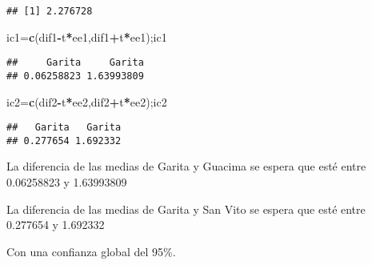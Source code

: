 \documentclass[
]{article}
\newenvironment{Shaded}{\begin{snugshade}}{\end{snugshade}}
\newcommand{\FunctionTok}[1]{\textcolor[rgb]{0.13,0.29,0.53}{\textbf{#1}}}
\newcommand{\NormalTok}[1]{#1}
\newcommand{\OtherTok}[1]{\textcolor[rgb]{0.56,0.35,0.01}{#1}}
\newcommand{\SpecialCharTok}[1]{\textcolor[rgb]{0.81,0.36,0.00}{\textbf{#1}}}
\begin{document}
\begin{verbatim}
## [1] 2.276728
\end{verbatim}

\begin{Shaded}
\begin{Highlighting}[]
\NormalTok{ic1}\OtherTok{=}\FunctionTok{c}\NormalTok{(dif1}\SpecialCharTok{{-}}\NormalTok{t}\SpecialCharTok{*}\NormalTok{ee1,dif1}\SpecialCharTok{+}\NormalTok{t}\SpecialCharTok{*}\NormalTok{ee1);ic1}
\end{Highlighting}
\end{Shaded}

\begin{verbatim}
##     Garita     Garita 
## 0.06258823 1.63993809
\end{verbatim}

\begin{Shaded}
\begin{Highlighting}[]
\NormalTok{ic2}\OtherTok{=}\FunctionTok{c}\NormalTok{(dif2}\SpecialCharTok{{-}}\NormalTok{t}\SpecialCharTok{*}\NormalTok{ee2,dif2}\SpecialCharTok{+}\NormalTok{t}\SpecialCharTok{*}\NormalTok{ee2);ic2}
\end{Highlighting}
\end{Shaded}

\begin{verbatim}
##   Garita   Garita 
## 0.277654 1.692332
\end{verbatim}

La diferencia de las medias de Garita y Guacima se espera que esté entre
0.06258823 y 1.63993809

La diferencia de las medias de Garita y San Vito se espera que esté
entre 0.277654 y 1.692332

Con una confianza global del 95\%.
\end{document}

